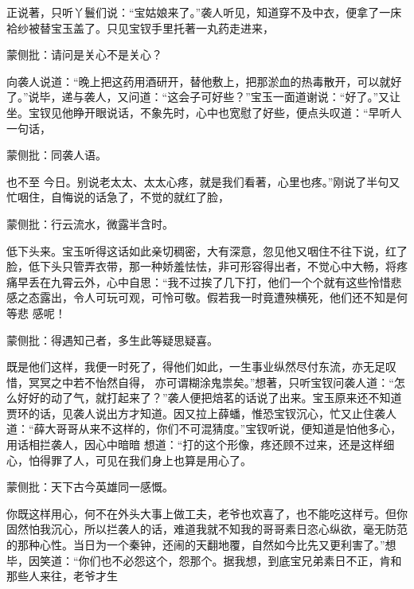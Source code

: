 \begin{parag}
    正说著，只听丫鬟们说：“宝姑娘来了。”袭人听见，知道穿不及中衣，便拿了一床袷纱被替宝玉盖了。只见宝钗手里托著一丸药走进来，\begin{note}蒙侧批：请问是关心不是关心？\end{note}向袭人说道：“晚上把这药用酒研开，替他敷上，把那淤血的热毒散开，可以就好了。”说毕，递与袭人，又问道：“这会子可好些？”宝玉一面道谢说：“好了。”又让坐。宝钗见他睁开眼说话，不象先时，心中也宽慰了好些，便点头叹道：“早听人一句话，\begin{note}蒙侧批：同袭人语。\end{note}也不至 今日。别说老太太、太太心疼，就是我们看著，心里也疼。”刚说了半句又忙咽住，自悔说的话急了，不觉的就红了脸，\begin{note}蒙侧批：行云流水，微露半含时。\end{note}低下头来。宝玉听得这话如此亲切稠密，大有深意，忽见他又咽住不往下说，红了脸，低下头只管弄衣带，那一种娇羞怯怯，非可形容得出者，不觉心中大畅，将疼痛早丢在九霄云外，心中自思：“我不过挨了几下打，他们一个个就有这些怜惜悲感之态露出，令人可玩可观，可怜可敬。假若我一时竟遭殃横死，他们还不知是何等悲 感呢！\begin{note}蒙侧批：得遇知己者，多生此等疑思疑喜。\end{note}既是他们这样，我便一时死了，得他们如此，一生事业纵然尽付东流，亦无足叹惜，冥冥之中若不怡然自得， 亦可谓糊涂鬼祟矣。”想著，只听宝钗问袭人道：“怎么好好的动了气，就打起来了？”袭人便把焙茗的话说了出来。宝玉原来还不知道贾环的话，见袭人说出方才知道。因又拉上薛蟠，惟恐宝钗沉心，忙又止住袭人道：“薛大哥哥从来不这样的，你们不可混猜度。”宝钗听说，便知道是怕他多心，用话相拦袭人，因心中暗暗 想道：“打的这个形像，疼还顾不过来，还是这样细心，怕得罪了人，可见在我们身上也算是用心了。\begin{note}蒙侧批：天下古今英雄同一感慨。\end{note}你既这样用心，何不在外头大事上做工夫，老爷也欢喜了，也不能吃这样亏。但你固然怕我沉心，所以拦袭人的话，难道我就不知我的哥哥素日恣心纵欲，毫无防范的那种心性。当日为一个秦钟，还闹的天翻地覆，自然如今比先又更利害了。”想毕，因笑道：“你们也不必怨这个，怨那个。据我想，到底宝兄弟素日不正，肯和那些人来往，老爷才生 
\end{parag}
